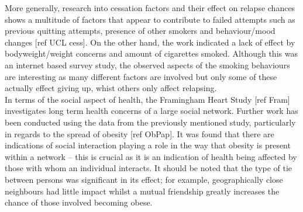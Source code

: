 \documentclass[]{report}
\begin{document}
More generally, research into cessation factors and their effect on relapse chances shows a multitude of factors that appear to contribute to failed attempts such as previous quitting attempts, presence of other smokers and behaviour/mood changes [ref UCL cess]. On the other hand, the work indicated a lack of effect by bodyweight/weight concerns and amount of cigarettes smoked. Although this was an internet based survey study, the observed aspects of the smoking behaviours are interesting as many different factors are involved but only some of these actually effect giving up, whist others only affect relapsing. \\
In terms of the social aspect of health, the Framingham Heart Study [ref Fram] investigates long term health concerns of a large social network. Further work has been conducted using the data from the previously mentioned study, particularly in regards to the spread of obesity [ref ObPap]. It was found that there are indications of social interaction playing a role in the way that obesity is present within a network – this is crucial as it is an indication of health being affected by those with whom an individual interacts. It should be noted that the type of tie between persons was significant in its effect; for example, geographically close neighbours had little impact whilst a mutual friendship greatly increases the chance of those involved becoming obese.
\end{document}
